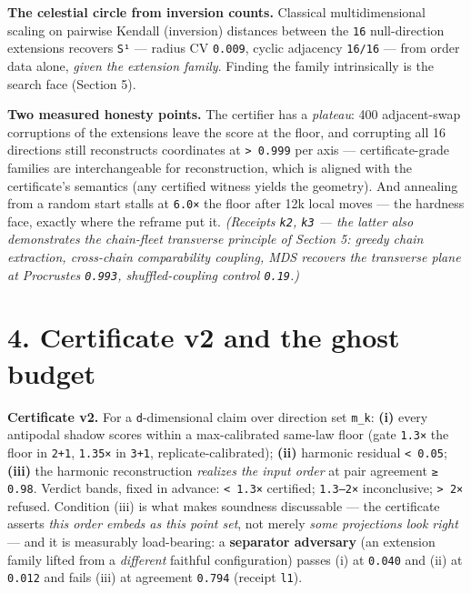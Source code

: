 \documentclass[11pt]{article}
\begin{document}
\textbf{The celestial circle from inversion counts.} Classical multidimensional scaling on pairwise Kendall (inversion) distances between the \texttt{16} null-direction extensions recovers \texttt{S¹} — radius CV \texttt{0.009}, cyclic adjacency \texttt{16/16} — from order data alone, \emph{given the extension family}. Finding the family intrinsically is the search face (Section 5).

\textbf{Two measured honesty points.} The certifier has a \emph{plateau}: 400 adjacent-swap corruptions of the extensions leave the score at the floor, and corrupting all 16 directions still reconstructs coordinates at \texttt{> 0.999} per axis — certificate-grade families are interchangeable for reconstruction, which is aligned with the certificate's semantics (any certified witness yields the geometry). And annealing from a random start stalls at \texttt{6.0×} the floor after 12k local moves — the hardness face, exactly where the reframe put it. \emph{(Receipts \texttt{k2}, \texttt{k3} — the latter also demonstrates the chain-fleet transverse principle of Section 5: greedy chain extraction, cross-chain comparability coupling, MDS recovers the transverse plane at Procrustes \texttt{0.993}, shuffled-coupling control \texttt{0.19}.)}

\section*{4. Certificate v2 and the ghost budget}
\textbf{Certificate v2.} For a \texttt{d}-dimensional claim over direction set \texttt{{m\_k}}: \textbf{(i)} every antipodal shadow scores within a max-calibrated same-law floor (gate \texttt{1.3×} the floor in \texttt{2+1}, \texttt{1.35×} in \texttt{3+1}, replicate-calibrated); \textbf{(ii)} harmonic residual \texttt{< 0.05}; \textbf{(iii)} the harmonic reconstruction \emph{realizes the input order} at pair agreement \texttt{≥ 0.98}. Verdict bands, fixed in advance: \texttt{< 1.3×} certified; \texttt{1.3–2×} inconclusive; \texttt{> 2×} refused. Condition (iii) is what makes soundness discussable — the certificate asserts \emph{this order embeds as this point set}, not merely \emph{some projections look right} — and it is measurably load-bearing: a \textbf{separator adversary} (an extension family lifted from a \emph{different} faithful configuration) passes (i) at \texttt{0.040} and (ii) at \texttt{0.012} and fails (iii) at agreement \texttt{0.794} (receipt \texttt{l1}).
\end{document}
